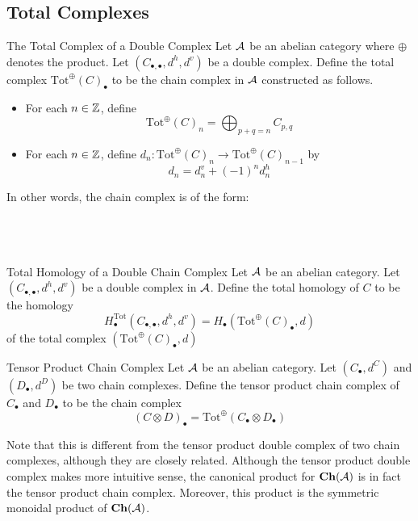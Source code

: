 \documentclass[a4paper]{article}
\begin{document}
\subsection{Total Complexes}
\begin{defn}{The Total Complex of a Double Complex}{} Let $\mathcal{A}$ be an abelian category where $\oplus$ denotes the product. Let $(C_{\bullet,\bullet},d^h,d^v)$ be a double complex. Define the total complex $\text{Tot}^\oplus(C)_\bullet$ to be the chain complex in $\mathcal{A}$ constructed as follows. 
\begin{itemize}
\item For each $n\in\mathbb{Z}$, define $$\text{Tot}^\oplus(C)_n=\bigoplus_{p+q=n}C_{p,q}$$
\item For each $n\in\mathbb{Z}$, define $d_n:\text{Tot}^\oplus(C)_n\to\text{Tot}^\oplus(C)_{n-1}$ by $$d_n=d_n^v+(-1)^nd_n^h$$
\end{itemize}
In other words, the chain complex is of the form: \\~\\
\\~\\
\end{defn}

\begin{defn}{Total Homology of a Double Chain Complex}{} Let $\mathcal{A}$ be an abelian category. Let $(C_{\bullet,\bullet},d^h,d^v)$ be a double complex in $\mathcal{A}$. Define the total homology of $C$ to be the homology $$H_\bullet^\text{Tot}(C_{\bullet,\bullet},d^h,d^v)=H_\bullet(\text{Tot}^\oplus(C)_\bullet,d)$$ of the total complex $(\text{Tot}^\oplus(C)_\bullet,d)$
\end{defn}

\begin{defn}{Tensor Product Chain Complex}{} Let $\mathcal{A}$ be an abelian category. Let $(C_\bullet,d^C)$ and $(D_\bullet,d^D)$ be two chain complexes. Define the tensor product chain complex of $C_\bullet$ and $D_\bullet$ to be the chain complex $$(C\otimes D)_\bullet=\text{Tot}^\oplus(C_\bullet\otimes D_\bullet)$$
\end{defn}

Note that this is different from the tensor product double complex of two chain complexes, although they are closely related. Although the tensor product double complex makes more intuitive sense, the canonical product for $\bold{Ch}(\mathcal{A})$ is in fact the tensor product chain complex. Moreover, this product is the symmetric monoidal product of $\bold{Ch}(\mathcal{A})$. 
\end{document}
